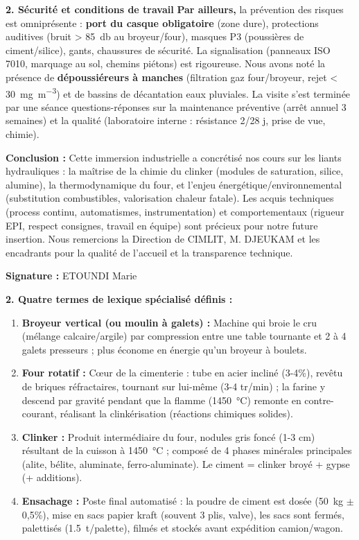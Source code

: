 \documentclass[11pt]{article}
\begin{document}
\begin{exemplebox}
\textbf{2. Sécurité et conditions de travail}
\textbf{Par ailleurs,} la prévention des risques est omniprésente : \textbf{port du casque obligatoire} (zone dure), protections auditives (bruit > \SI{85}{\decibel} au broyeur/four), masques P3 (poussières de ciment/silice), gants, chaussures de sécurité. La signalisation (panneaux ISO 7010, marquage au sol, chemins piétons) est rigoureuse. Nous avons noté la présence de \textbf{dépoussiéreurs à manches} (filtration gaz four/broyeur, rejet < \SI{30}{\milli\gram\per\cubic\meter}) et de bassins de décantation eaux pluviales. La visite s'est terminée par une séance questions-réponses sur la maintenance préventive (arrêt annuel 3 semaines) et la qualité (laboratoire interne : résistance 2/28 j, prise de vue, chimie).

\textbf{Conclusion :}
Cette immersion industrielle a concrétisé nos cours sur les liants hydrauliques : la maîtrise de la chimie du clinker (modules de saturation, silice, alumine), la thermodynamique du four, et l'enjeu énergétique/environnemental (substitution combustibles, valorisation chaleur fatale). Les acquis techniques (process continu, automatismes, instrumentation) et comportementaux (rigueur EPI, respect consignes, travail en équipe) sont précieux pour notre future insertion. Nous remercions la Direction de CIMLIT, M. DJEUKAM et les encadrants pour la qualité de l'accueil et la transparence technique.

\textbf{Signature :} ETOUNDI Marie

\textbf{2. Quatre termes de lexique spécialisé définis :}
\begin{enumerate}
\item \textbf{Broyeur vertical (ou moulin à galets) :} Machine qui broie le cru (mélange calcaire/argile) par compression entre une table tournante et 2 à 4 galets presseurs ; plus économe en énergie qu'un broyeur à boulets.
\item \textbf{Four rotatif :} Cœur de la cimenterie : tube en acier incliné (3-4\%), revêtu de briques réfractaires, tournant sur lui-même (3-4 tr/min) ; la farine y descend par gravité pendant que la flamme (\SI{1450}{\celsius}) remonte en contre-courant, réalisant la clinkérisation (réactions chimiques solides).
\item \textbf{Clinker :} Produit intermédiaire du four, nodules gris foncé (1-3 cm) résultant de la cuisson à \SI{1450}{\celsius} ; composé de 4 phases minérales principales (alite, bélite, aluminate, ferro-aluminate). Le ciment = clinker broyé + gypse (+ additions).
\item \textbf{Ensachage :} Poste final automatisé : la poudre de ciment est dosée (\SI{50}{kg} $\pm$ 0,5\%), mise en sacs papier kraft (souvent 3 plis, valve), les sacs sont fermés, palettisés (\SI{1.5}{t/palette}), filmés et stockés avant expédition camion/wagon.
\end{enumerate}


\end{exemplebox}
\end{document}
